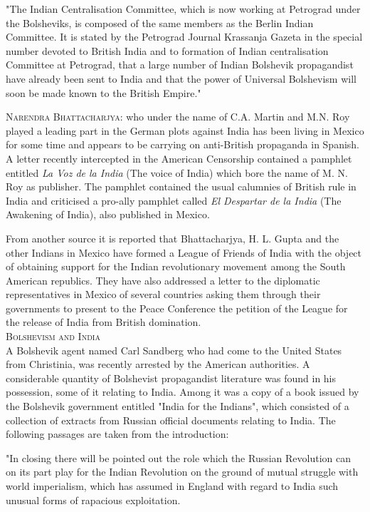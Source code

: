 "The Indian Centralisation Committee, which is now working at Petrograd under the Bolsheviks, is composed of the same members as the Berlin Indian Committee. It is stated by the Petrograd Journal Krassanja Gazeta in the special number devoted to British India and to formation of Indian centralisation Committee at Petrograd, that a large number of Indian Bolshevik propagandist have already been sent to India and that 
the power of Universal Bolshevism will soon be made known to the British Empire." 

\textsc{Narendra Bhattacharjya:} who under the name of C.A. Martin and M.N. Roy played a leading part in the German plots against India has been living in Mexico for some time and appears to be carrying on anti-British propaganda in Spanish. A letter recently intercepted in the American Censorship contained a pamphlet entitled \textit{La Voz de la India} (The voice of India) which bore the name of M. N. Roy as publisher. The pamphlet contained the usual calumnies of British rule in India and criticised a pro-ally pamphlet called \textit{El Despartar de la India} (The Awakening of India), also published in Mexico. 

From another source it is reported that Bhattacharjya, H. L. Gupta and the other Indians in Mexico have formed a League of Friends of India with the object of obtaining support for the Indian revolutionary movement among the South American republics. They have also addressed a letter to the diplomatic representatives in Mexico of several countries asking them through their governments to present to 
the Peace Conference the petition of the League for the release of India from British domination. \\

\textsc{Bolshevism and India}\\

A Bolshevik agent named Carl Sandberg who had come to the United States from Christinia, was recently arrested by the American authorities. A considerable quantity of Bolshevist propagandist literature was found in his possession, some of it relating to India. Among it was a copy of a book issued by the Bolshevik government entitled "India for the Indians", which consisted of a collection of extracts from Russian 
official documents relating to India. The following passages are taken from the introduction: 

"In closing there will be pointed out the role which the Russian Revolution can on its part play for the Indian Revolution on the ground of mutual struggle with world imperialism, which has assumed in England with regard to India such unusual forms of rapacious exploitation. 

